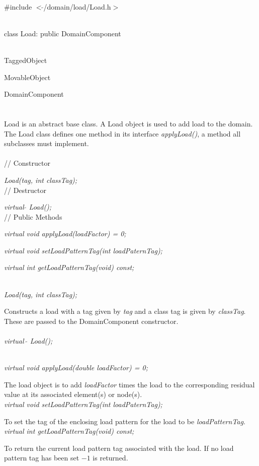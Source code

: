 
   \\
\#include $<\tilde{ }$/domain/load/Load.h$>$  


  \\
class Load: public DomainComponent  


 \\
TaggedObject 

MovableObject 

\indent\indent DomainComponent \\
\indent\indent{} \\

  \\
\indent Load is an abstract base class. A Load object is used to add
load to the domain. The Load class defines one method in its interface
{\em applyLoad()}, a method all subclasses must implement. \\


  \\
// Constructor  

{\em Load(tag, int classTag);}  \\ 

// Destructor  

{\em virtual $\tilde{ }$ Load();} \\ 

// Public Methods   

{\em virtual void applyLoad(loadFactor) = 0;} 

{\em virtual void setLoadPatternTag(int loadPaternTag);}

{\em virtual int  getLoadPatternTag(void) const;}


  \\
{\em Load(tag, int classTag);}  

Constructs a load with a tag given by {\em tag} and a class tag is
given by {\em classTag}. These are passed to the DomainComponent constructor. \\

  \\
{\em virtual~$\tilde{}$ Load();} 


  \\
{\em virtual void applyLoad(double loadFactor) = 0;} 

The load object is to add {\em loadFactor} times the load to the
corresponding residual value at its associated element(s) or node(s). \\

{\em virtual void setLoadPatternTag(int loadPaternTag);}

To set the tag of the enclosing load pattern for the load to be 
{\em loadPatternTag}. \\

{\em virtual int  getLoadPatternTag(void) const;}

To return the current load pattern tag associated with the load. If no
load pattern tag has been set $-1$ is returned.

